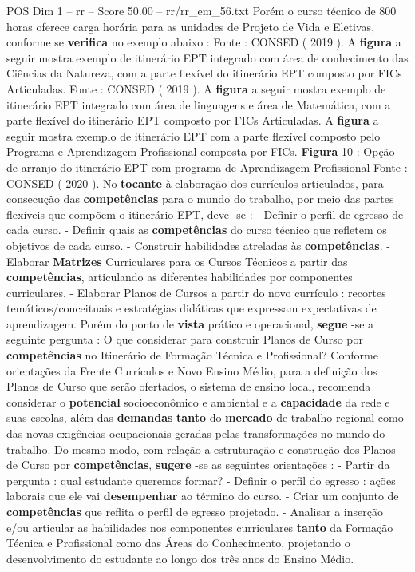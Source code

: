 \begin{textsample}{POS Dim 1 – rr – Score 50.00 – rr/rr\_em\_56.txt}
Porém o curso técnico de 800 horas oferece carga horária para as unidades de Projeto de Vida e Eletivas, conforme se \textbf{verifica} no exemplo abaixo : Fonte : CONSED ( 2019 ).
A \textbf{figura} a seguir mostra exemplo de itinerário EPT integrado com área de conhecimento das Ciências da Natureza, com a parte flexível do itinerário EPT composto por FICs Articuladas.
Fonte : CONSED ( 2019 ).
A \textbf{figura} a seguir mostra exemplo de itinerário EPT integrado com área de linguagens e área de Matemática, com a parte flexível do itinerário EPT composto por FICs Articuladas.
A \textbf{figura} a seguir mostra exemplo de itinerário EPT com a parte flexível composto pelo Programa e Aprendizagem Profissional composta por FICs. \textbf{Figura} 10 : Opção de arranjo do itinerário EPT com programa de Aprendizagem Profissional Fonte : CONSED ( 2020 ).
No \textbf{tocante} à elaboração dos currículos articulados, para consecução das \textbf{competências} para o mundo do trabalho, por meio das partes flexíveis que compõem o itinerário EPT, deve -se : - Definir o perfil de egresso de cada curso. - Definir quais as \textbf{competências} do curso técnico que refletem os objetivos de cada curso. - Construir habilidades atreladas às \textbf{competências}. - Elaborar \textbf{Matrizes} Curriculares para os Cursos Técnicos a partir das \textbf{competências}, articulando as diferentes habilidades por componentes curriculares. - Elaborar Planos de Cursos a partir do novo currículo : recortes temáticos/conceituais e estratégias didáticas que expressam expectativas de aprendizagem.
Porém do ponto de \textbf{vista} prático e operacional, \textbf{segue} -se a seguinte pergunta : O que considerar para construir Planos de Curso por \textbf{competências} no Itinerário de Formação Técnica e Profissional?
Conforme orientações da Frente Currículos e Novo Ensino Médio, para a definição dos Planos de Curso que serão ofertados, o sistema de ensino local, recomenda considerar o \textbf{potencial} socioeconômico e ambiental e a \textbf{capacidade} da rede e suas escolas, além das \textbf{demandas} \textbf{tanto} do \textbf{mercado} de trabalho regional como das novas exigências ocupacionais geradas pelas transformações no mundo do trabalho.
Do mesmo modo, com relação a estruturação e construção dos Planos de Curso por \textbf{competências}, \textbf{sugere} -se as seguintes orientações : - Partir da pergunta : qual estudante queremos formar? - Definir o perfil do egresso : ações laborais que ele vai \textbf{desempenhar} ao término do curso. - Criar um conjunto de \textbf{competências} que reflita o perfil de egresso projetado. - Analisar a inserção e/ou articular as habilidades nos componentes curriculares \textbf{tanto} da Formação Técnica e Profissional como das Áreas do Conhecimento, projetando o desenvolvimento do estudante ao longo dos três anos do Ensino Médio.

\end{textsample}
